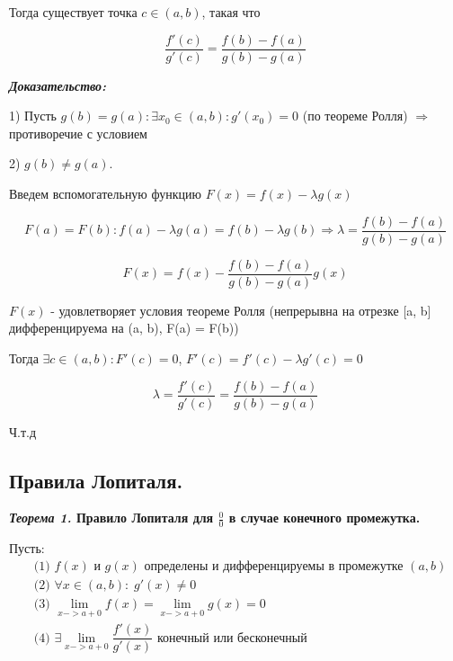 \documentclass[a4paper,12pt]{article}
\theoremstyle{plain} %
\theoremstyle{definition} %
\theoremstyle{remark} %
\begin{document}
Тогда существует точка $c \in (a, b)$, такая что

\[
	\frac{f'(c)}{g'(c)} = \frac{f(b) - f(a)}{g(b) - g(a)}
\]

\textit{\textbf{Доказательство:}}

1) Пусть $g(b) = g(a): \exists x_0 \in (a, b): g'(x_0) = 0$ (по теореме Ролля) $\Rightarrow$ противоречие с условием

2) $g(b) \neq g(a)$.

Введем вспомогательную функцию $F(x) = f(x) - \lambda g(x)$

\[
	F(a) = F(b): f(a) - \lambda g(a) = f(b) - \lambda g(b) \Rightarrow \lambda  = \frac{f(b) - f(a)}{g(b) - g(a)}
\]

\[
	F(x) = f(x) - \frac{f(b) - f(a)}{g(b) - g(a)}g(x)
\]

$F(x)$ - удовлетворяет условия теореме Ролля (непрерывна на отрезке [a, b] дифференцируема на (a, b), F(a) = F(b))

Тогда $\exists c \in (a, b): F'(c) = 0$, $F'(c) = f'(c) - \lambda g'(c) = 0$

\[
	\lambda = \frac{f'(c)}{g'(c)} = \frac{f(b) - f(a)}{g(b) - g(a)}
\]

Ч.т.д


\newpage
{}
\subsection*{Правила Лопиталя.                                                                          }

\textbf{\textit{Теорема 1.} Правило Лопиталя для $\frac{0}{0}$ в случае конечного промежутка.}

Пусть:
\begin{equation*}
	\begin{aligned}
		 & \text{(1) } f(x) \text{ и } g(x) \text{ определены и дифференцируемы в промежутке }(a, b)    \\
		 & \text{(2) } \forall x \in (a, b): \; g'(x) \neq 0                                            \\
		 & \text{(3) }  \lim_{x-> a + 0} f(x) =  \lim_{x-> a + 0} g(x) = 0                              \\
		 & \text{(4) }  \exists \lim_{x-> a + 0} \dfrac{f'(x)}{g'(x)} \text{ конечный или бесконечный } \\
	\end{aligned}
\end{equation*}
\end{document}

